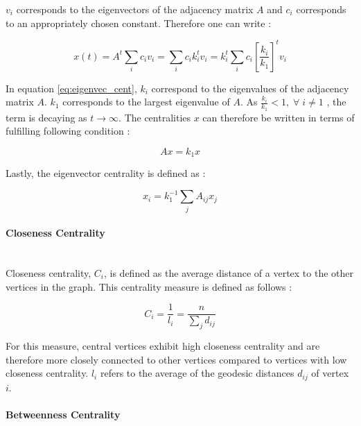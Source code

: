 	\noindent $v_i$ corresponds to the eigenvectors of the adjacency matrix $A$
	and $c_i$ corresponds to an appropriately chosen constant. Therefore one can
	write \citep[p. 170]{Newman2010}:

	\begin{equation}
		x(t) =  A^t \sum_{i}c_{i}v_{i} = \sum_{i} c_i k_i^t v_i = 
		k_i^t \sum_{i} c_i \left[\frac{k_i}{k_1}\right]^t v_i
		\label{eq:eigenvec_cent}
	\end{equation}

	\noindent In equation \ref{eq:eigenvec_cent}, $k_i$ correspond to the 
	eigenvalues of the adjacency matrix $A$. $k_1$ corresponds to the largest 
	eigenvalue of $A$. As $\frac{k_i}{k_1} < 1, \; \forall \; i\neq 1$ , the 
	term is decaying as $t \rightarrow \infty$. The centralities $x$ can 
	therefore be written in terms of fulfilling following condition 
	\citep[p. 170]{Newman2010}:

	\begin{equation}
		Ax = k_1 x	
	\end{equation}

	\noindent Lastly, the eigenvector centrality is defined as \citep[p. 170]{Newman2010}:

	\begin{equation}
		x_i = k_{1}^{-1} \sum_{j} A_{ij}x_j 
	\end{equation}

	\paragraph{Closeness Centrality} \mbox{}\\

	\noindent Closeness centrality, $C_i$, is defined as the average distance 
	of a vertex to the other vertices in the graph. This centrality measure is 
	defined as follows \citep[p. 182]{Newman2010}:

	\begin{equation}
		C_i = \frac{1}{l_i} = \frac{n}{\sum_{j}d_{ij}}
	\end{equation}

	\noindent For this measure, central vertices exhibit high closeness 
	centrality and are therefore more closely connected to other vertices 
	compared to vertices with low closeness centrality. $l_i$ refers to the 
	average of the geodesic distances $d_{ij}$ of vertex $i$.

	\paragraph{Betweenness Centrality} \mbox{}\\

